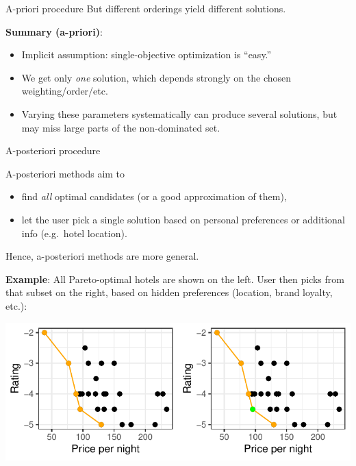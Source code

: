 \documentclass[11pt,compress,t,notes=noshow,xcolor=table]{beamer}
\begin{document}
\begin{vbframe}{A-priori procedure}
But different orderings yield different solutions.

{\footnotesize
\textbf{Summary (a-priori)}:
\vspace{-0.1cm}
\begin{itemize}\setlength{\itemsep}{0.7em}
\item Implicit assumption: single-objective optimization is “easy.”
\item We get only \emph{one} solution, which depends strongly on the chosen weighting/order/etc.
\item Varying these parameters systematically can produce several solutions, but may miss large parts of the non-dominated set.
\end{itemize}
}


\end{vbframe}

\begin{vbframe}{A-posteriori procedure}

{\footnotesize
A-posteriori methods aim to
\begin{itemize}
  \item find \emph{all} optimal candidates (or a good approximation of them),
  \item let the user pick a single solution based on personal preferences or 
        additional info (e.g.\ hotel location).
\end{itemize}
Hence, a-posteriori methods are more general.
}

{\footnotesize
\textbf{Example}: 
All Pareto-optimal hotels are shown on the left. 
User then picks from that subset on the right, based on hidden preferences 
(location, brand loyalty, etc.):
}
\begin{center}
\includegraphics[scale=0.8]{slides/11-multicrit/figure_man/expedia-11-1.pdf}
\end{center}

\end{vbframe}
\end{document}
